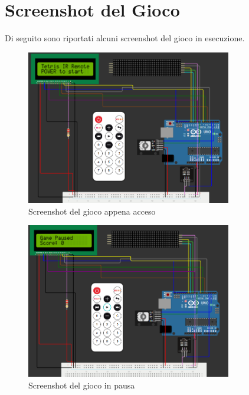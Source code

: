 \documentclass[a4paper, 12pt]{article}
\begin{document}
\section{Screenshot del Gioco}
\label{sec:screenshot}
Di seguito sono riportati alcuni screenshot del gioco in esecuzione.

\begin{figure}[H]
    \centering
    \includegraphics[width=0.8\textwidth]{media/appena_acceso.png}
    \caption{Screenshot del gioco appena acceso}
    \label{fig:appena_acceso}
\end{figure}
\begin{figure}[H]
    \centering
    \includegraphics[width=0.8\textwidth]{media/pausa.png}
    \caption{Screenshot del gioco in pausa}
    \label{fig:pausa}
\end{figure}
\end{document}
